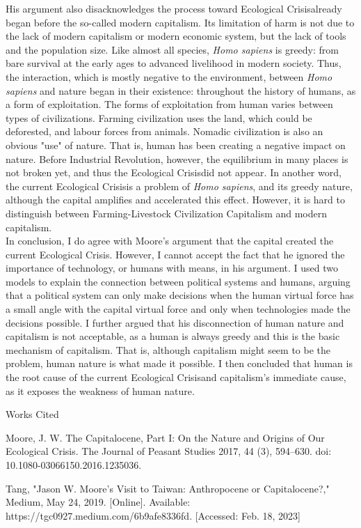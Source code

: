 \documentclass[12pt]{article}
\newcommand{\IR}{Industrial Revolution}
\newcommand{\EC}{Ecological Crisis}
\newcommand{\bibent}{\noindent \hangindent 40pt}
\newenvironment{workscited}{\newpage \begin{center} Works Cited \end{center}}{\newpage }
\begin{document}
\begin{flushleft}
His argument also disacknowledges the process toward \EC already began before the  so-called modern capitalism.
Its limitation of harm is not due to the lack of modern capitalism or modern economic system, but the lack of tools and the population size. 
Like almost all species, \textit{Homo sapiens} is greedy: from bare survival at the early ages to advanced livelihood in modern society. Thus, the interaction, which is mostly negative to the environment, between \textit{Homo sapiens} and nature began in their existence: throughout the history of humans, as a form of exploitation. The forms of exploitation from human varies between types of civilizations. Farming civilization uses the land, which could be deforested, and labour forces from animals. Nomadic civilization is also an obvious "use" of nature. That is, human has been creating a negative impact on nature. Before \IR, however, the equilibrium in many places is not broken yet, and thus the \EC did not appear. In another word, the current \EC is a problem of \textit{Homo sapiens}, and its greedy nature, although the capital amplifies and accelerated this effect. However, it is hard to distinguish between Farming-Livestock Civilization Capitalism and modern capitalism.
\\


In conclusion, I do agree with Moore's argument that the capital created the current \EC. However, I cannot accept the fact that he ignored the importance of technology, or humans with means, in his argument. I used two models to explain the connection between political systems and humans, arguing that a political system can only make decisions when the human virtual force has a small angle with the capital virtual force and only when technologies made the decisions possible. I further argued that his disconnection of human nature and capitalism is not acceptable, as a human is always greedy and this is the basic mechanism of capitalism. That is, although capitalism might seem to be the problem, human nature is what made it possible. I then concluded that human is the root cause of the current \EC and capitalism's immediate cause, as it exposes the weakness of human nature.
\newpage



\begin{workscited}

\bibent Moore, J. W. The Capitalocene, Part I: On the Nature and Origins of Our Ecological Crisis. The Journal of Peasant Studies 2017, 44 (3), 594–630. doi: 10.1080-03066150.2016.1235036.

\bibent 
 Tang, "Jason W. Moore's Visit to Taiwan: Anthropocene or Capitalocene?," Medium, May 24, 2019. [Online]. Available: https://tgc0927.medium.com/6b9afe8336fd. [Accessed: Feb. 18, 2023]



\end{workscited}

\end{flushleft}
\end{document}

